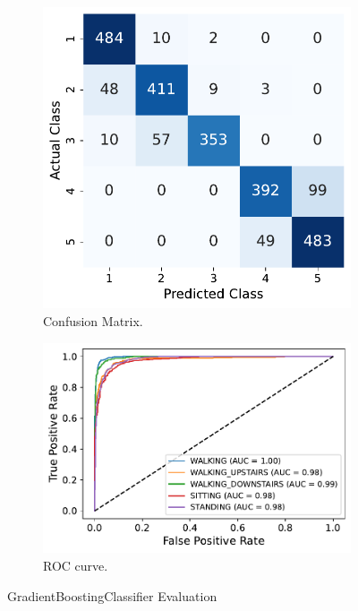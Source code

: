 \documentclass[10pt, a4paper, twocolumn]{article}
\begin{document}
\begin{figure}
    \centering
    \begin{subfigure}[t]{0.40\columnwidth}
    \includegraphics[width=\linewidth]{immagini simone/gbclassifier_conf_mtx.pdf}
    \caption{Confusion Matrix.}
    \label{fig:gbclassifier_confusion}
\end{subfigure}
  \hfill %
\begin{subfigure}[t]{0.55\columnwidth}
    \includegraphics[width=\linewidth]{immagini simone/gbclassifier_roc.pdf}
    \caption{ROC curve.}
    \label{fig:gbclassifier_roc}
\end{subfigure}
\caption{GradientBoostingClassifier Evaluation}
\label{fig:gbclassifier}
\end{figure}
\end{document}
